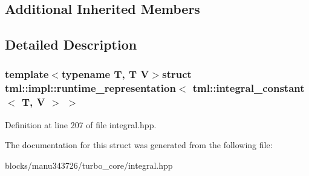 \subsection*{Additional Inherited Members}


\subsection{Detailed Description}
\subsubsection*{template$<$typename T, T V$>$struct tml\+::impl\+::runtime\+\_\+representation$<$ tml\+::integral\+\_\+constant$<$ T, V $>$ $>$}



Definition at line 207 of file integral.\+hpp.



The documentation for this struct was generated from the following file\+:\begin{DoxyCompactItemize}
\item 
blocks/manu343726/turbo\+\_\+core/integral.\+hpp\end{DoxyCompactItemize}

